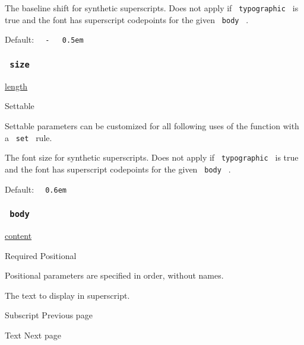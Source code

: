 The baseline shift for synthetic superscripts. Does not apply if
\texttt{\ typographic\ } is true and the font has superscript codepoints
for the given \texttt{\ body\ } .

Default:
\texttt{\ }{\texttt{\ -\ }}\texttt{\ }{\texttt{\ 0.5em\ }}\texttt{\ }

\subsubsection{\texorpdfstring{\texttt{\ size\ }}{ size }}\label{parameters-size}

\href{/docs/reference/layout/length/}{length}

{{ Settable }}

\label{parameters-size-settable-tooltip}
Settable parameters can be customized for all following uses of the
function with a \texttt{\ set\ } rule.

The font size for synthetic superscripts. Does not apply if
\texttt{\ typographic\ } is true and the font has superscript codepoints
for the given \texttt{\ body\ } .

Default: \texttt{\ }{\texttt{\ 0.6em\ }}\texttt{\ }

\subsubsection{\texorpdfstring{\texttt{\ body\ }}{ body }}\label{parameters-body}

\href{/docs/reference/foundations/content/}{content}

{Required} {{ Positional }}

\label{parameters-body-positional-tooltip}
Positional parameters are specified in order, without names.

The text to display in superscript.

\href{/docs/reference/text/sub/}{\pandocbounded{}}

{ Subscript } { Previous page }

\href{/docs/reference/text/text/}{\pandocbounded{}}

{ Text } { Next page }
